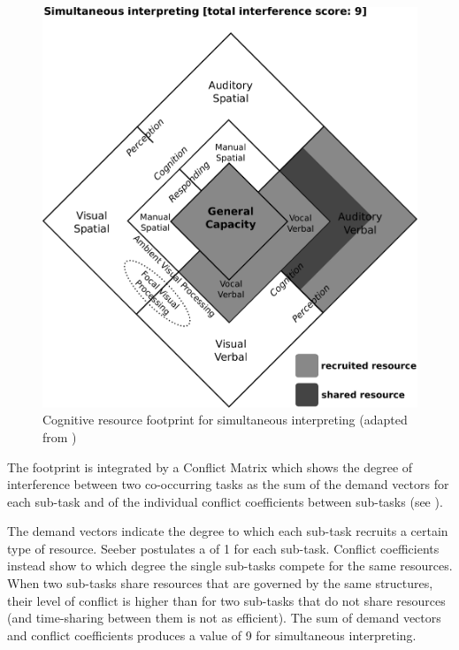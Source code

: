 \documentclass[output=paper]{langsci/langscibook}
\begin{document}
\begin{figure}
	\includegraphics[width=.4\textheight]{figures/Seeberlozenge.pdf}
	\caption{\label{fig:prandi:2}Cognitive resource footprint for simultaneous interpreting (adapted from \citealt[1385]{Seeber2007})}
\end{figure}
 
The footprint is integrated by a Conflict Matrix which shows the degree of interference between two co-occurring tasks as the sum of the demand vectors for each sub-task and of the individual conflict coefficients between sub-tasks (see ). 

The demand vectors indicate the degree to which each sub-task recruits a certain type of resource. Seeber postulates a  of 1 for each sub-task. Conflict coefficients instead show to which degree the single sub-tasks compete for the same resources. When two sub-tasks share resources that are governed by the same structures, their level of conflict is higher than for two sub-tasks that do not share resources (and time-sharing between them is not as efficient). The sum of demand vectors and conflict coefficients produces a value of 9 for simultaneous interpreting.
\end{document}
